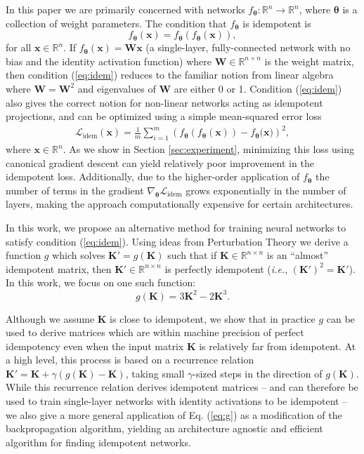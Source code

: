 \documentclass{article}
\theoremstyle{plain}
\theoremstyle{definition}
\theoremstyle{remark}
\newcommand{\vx}{\mathbf{x}}
\newcommand{\vK}{\mathbf{K}}
\newcommand{\vW}{\mathbf{W}}
\newcommand{\vtheta}{\bm{\theta}}
\begin{document}
In this paper we are primarily concerned with networks ${f_{\vtheta}: \mathbb{R}^n \to \mathbb{R}^n}$, where $\vtheta$ is a collection of weight parameters. The condition that $f_{\vtheta}$ is idempotent is
%
\begin{equation}
    f_{\vtheta}(\vx) = f_{\vtheta}(f_{\vtheta}(\vx)),
    \label{eq:idem}
\end{equation}
%
for all ${\vx \in \mathbb{R}^n}$. If ${f_{\vtheta}(\vx) = \vW \vx}$ (a single-layer, fully-connected network with no bias and the identity activation function) where ${\vW \in \mathbb{R}^{n \times n}}$ is the weight matrix, then condition (\ref{eq:idem}) reduces to the familiar notion from linear algebra where $\vW = \vW^2$ and eigenvalues of $\vW$ are either 0 or 1. Condition (\ref{eq:idem}) also gives the correct notion for non-linear networks acting as idempotent projections, and can be optimized using a simple mean-squared error loss
%
\begin{align}
    \mathcal{L}_\text{idem}(\vx) = \frac{1}{m} \sum_{i = 1}^m \left(f_{\vtheta}(f_{\vtheta}(\vx)) - f_{\vtheta}\big(\vx \big)\right)^2,
    \label{eq:idem-loss}
\end{align}
%
where ${\vx \in \mathbb{R}^{n}}$. As we show in Section \ref{sec:experiment}, minimizing this loss using canonical gradient descent can yield relatively poor improvement in the idempotent loss. Additionally, due to the higher-order application of $f_{\vtheta}$ the number of terms in the gradient ${\nabla_{\vtheta} \mathcal{L}_{\text{idem}}}$ grows exponentially in the number of layers, making the approach computationally expensive for certain architectures.

In this work, we propose an alternative method for training neural networks to satisfy condition (\ref{eq:idem}). Using ideas from Perturbation Theory \cite{intro-pertub-theory} we derive a function $g$ which solves ${\vK' = g(\vK)}$ such that if ${\vK \in \mathbb{R}^{n \times n}}$ is an ``almost'' idempotent matrix, then ${\vK' \in \mathbb{R}^{n \times n}}$ is perfectly idempotent (\textit{i.e.}, ${(\vK')^2 = \vK'}$). In this work, we focus on one such function:
%
\begin{equation}
    g(\vK) = 3 \vK^2 - 2 \vK^3.
    \label{eq:g}
\end{equation}


Although we assume $\vK$ is close to idempotent, we show that in practice $g$ can be used to derive matrices which are within machine precision of perfect idempotency even when the input matrix $\vK$ is relatively far from idempotent. At a high level, this process is based on a recurrence relation ${\vK' = \vK + \gamma(g(\vK) - \vK)}$, taking small $\gamma$-sized steps in the direction of $g(\vK)$. While this recurrence relation derives idempotent matrices -- and can therefore be used to train single-layer networks with identity activations to be idempotent -- we also give a more general application of Eq. (\ref{eq:g}) as a modification of the backpropagation algorithm, yielding an architecture agnostic and efficient algorithm for finding idempotent networks.
\end{document}
